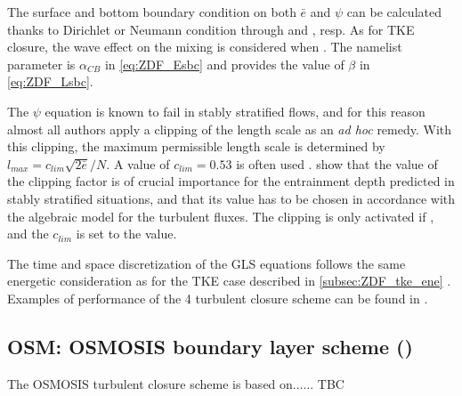 \documentclass[../main/NEMO_manual]{subfiles}
\begin{document}
The surface and bottom boundary condition on both $\bar{e}$ and $\psi$ can be calculated thanks to Dirichlet or
Neumann condition through  and , resp.
As for TKE closure, the wave effect on the mixing is considered when
 \citep{Craig_Banner_JPO94, Mellor_Blumberg_JPO04}.
The  namelist parameter is $\alpha_{CB}$ in \autoref{eq:ZDF_Esbc} and
 provides the value of $\beta$ in \autoref{eq:ZDF_Lsbc}. 

The $\psi$ equation is known to fail in stably stratified flows, and for this reason
almost all authors apply a clipping of the length scale as an \textit{ad hoc} remedy.
With this clipping, the maximum permissible length scale is determined by $l_{max} = c_{lim} \sqrt{2\bar{e}}/ N$.
A value of $c_{lim} = 0.53$ is often used \citep{Galperin_al_JAS88}.
\cite{Umlauf_Burchard_CSR05} show that the value of the clipping factor is of crucial importance for
the entrainment depth predicted in stably stratified situations,
and that its value has to be chosen in accordance with the algebraic model for the turbulent fluxes.
The clipping is only activated if ,
and the $c_{lim}$ is set to the  value.

The time and space discretization of the GLS equations follows the same energetic consideration as for
the TKE case described in \autoref{subsec:ZDF_tke_ene} \citep{Burchard_OM02}.
Examples of performance of the 4 turbulent closure scheme can be found in \citet{Warner_al_OM05}.

\subsection{OSM: OSMOSIS boundary layer scheme (\protect{})}
\label{subsec:ZDF_osm}



The OSMOSIS turbulent closure scheme is based on......   TBC
\end{document}
